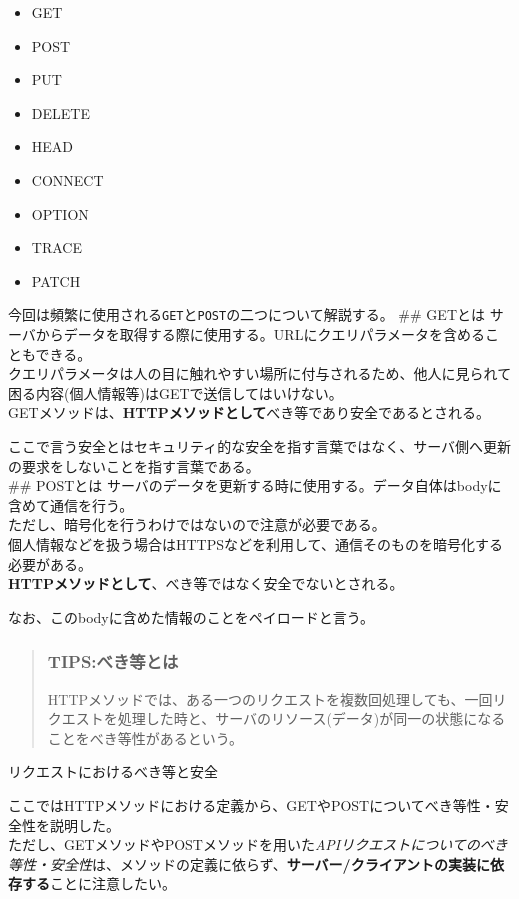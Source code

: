 \begin{itemize}
\tightlist
\item
  GET
\item
  POST
\item
  PUT
\item
  DELETE
\item
  HEAD
\item
  CONNECT
\item
  OPTION
\item
  TRACE
\item
  PATCH
\end{itemize}

今回は頻繁に使用される\texttt{GET}と\texttt{POST}の二つについて解説する。
\#\# GETとは
サーバからデータを取得する際に使用する。URLにクエリパラメータを含めることもできる。\\
クエリパラメータは人の目に触れやすい場所に付与されるため、他人に見られて困る内容(個人情報等)はGETで送信してはいけない。\\
GETメソッドは、\textbf{HTTPメソッドとして}べき等であり安全であるとされる。

ここで言う安全とはセキュリティ的な安全を指す言葉ではなく、サーバ側へ更新の要求をしないことを指す言葉である。\\
\#\# POSTとは
サーバのデータを更新する時に使用する。データ自体はbodyに含めて通信を行う。\\
ただし、暗号化を行うわけではないので注意が必要である。\\
個人情報などを扱う場合はHTTPSなどを利用して、通信そのものを暗号化する必要がある。\\
\textbf{HTTPメソッドとして}、べき等ではなく安全でないとされる。

なお、このbodyに含めた情報のことをペイロードと言う。

\begin{quote}
\subsubsection{TIPS:べき等とは}\label{tipsux3079ux304dux7b49ux3068ux306f}

HTTPメソッドでは、ある一つのリクエストを複数回処理しても、一回リクエストを処理した時と、サーバのリソース(データ)が同一の状態になることをべき等性があるという。
\end{quote}

リクエストにおけるべき等と安全

ここではHTTPメソッドにおける定義から、GETやPOSTについてべき等性・安全性を説明した。\\
ただし、GETメソッドやPOSTメソッドを用いた\emph{APIリクエストについてのべき等性・安全性}は、メソッドの定義に依らず、\textbf{サーバー/クライアントの実装に依存する}ことに注意したい。


